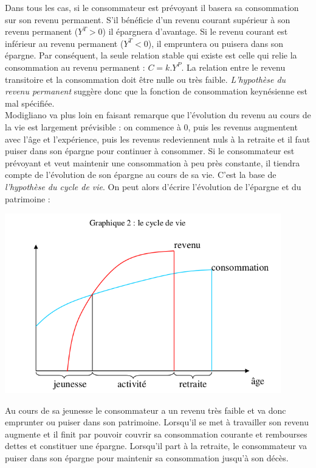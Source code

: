 \documentclass[10pt]{book}
\begin{document}
Dans tous les cas, si le consommateur est prévoyant il basera sa consommation sur son revenu permanent. S'il bénéficie d'un revenu courant supérieur à son revenu permanent ($Y^T > 0$) il épargnera d'avantage. Si le revenu courant est inférieur au revenu permanent ($Y^T < 0$), il empruntera ou puisera dans son épargne. Par conséquent, la seule relation stable qui existe est celle qui relie la consommation au revenu permanent : $C = k.Y^P$. La relation entre le revenu transitoire et la consommation doit être nulle ou très faible. \textit{L'hypothèse du revenu permanent} suggère donc que la fonction de consommation keynésienne est mal spécifiée. \\
Modigliano va plus loin en faisant remarque que l'évolution du revenu au cours de la vie est largement prévisible : on commence à 0, puis les revenus augmentent avec l'âge et l'expérience, puis les revenus redeviennent nuls à la retraite et il faut puiser dans son épargne pour continuer à consommer. Si le consommateur est prévoyant et veut maintenir une consommation à peu près constante, il tiendra compte de l'évolution de son épargne au cours de sa vie. C'est la base de \textit{l'hypothèse du cycle de vie}. On peut alors d'écrire l'évolution de l'épargne et du patrimoine :
\begin{center}
  \includegraphics[width=12cm]{graph12.png}
\end{center}
Au cours de sa jeunesse le consommateur a un revenu très faible et va donc emprunter ou puiser dans son patrimoine. Lorsqu'il se met à travailler son revenu augmente et il finit par pouvoir couvrir sa consommation courante et rembourses dettes et constituer une épargne. Lorsqu'il part à la retraite, le consommateur va puiser dans son épargne pour maintenir sa consommation jusqu'à son décès. \\
\end{document}
